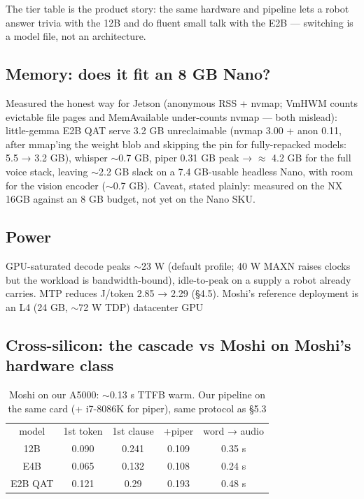 \documentclass[journal]{IEEEtran}
\begin{document}
The tier table is the product story: the same hardware and pipeline lets a robot answer trivia with the 12B and do fluent small talk with the E2B — switching is a model file, not an architecture.

\subsection{Memory: does it fit an 8 GB Nano?}
Measured the honest way for Jetson (anonymous RSS + nvmap; VmHWM counts evictable file pages and MemAvailable under-counts nvmap — both mislead): little-gemma E2B QAT serve 3.2 GB unreclaimable (nvmap 3.00 + anon 0.11, after mmap'ing the weight blob and skipping the pin for fully-repacked models: 5.5 → 3.2 GB), whisper $\sim$0.7 GB, piper 0.31 GB peak → $\approx$ 4.2 GB for the full voice stack, leaving $\sim$2.2 GB slack on a 7.4 GB-usable headless Nano, with room for the vision encoder ($\sim$0.7 GB). Caveat, stated plainly: measured on the NX 16GB against an 8 GB budget, not yet on the Nano SKU.

\subsection{Power}
GPU-saturated decode peaks $\sim$23 W (default profile; 40 W MAXN raises clocks but the workload is bandwidth-bound), idle-to-peak on a supply a robot already carries. MTP reduces J/token 2.85 → 2.29 (§4.5). Moshi's reference deployment is an L4 (24 GB, $\sim$72 W TDP) datacenter GPU

\subsection{Cross-silicon: the cascade vs Moshi on Moshi's hardware class}
\begin{table}[H]
    \centering
    \small
    \begin{tabular}{ccccc}
       model  &  1st token & 1st clause & +piper & word → audio \\
        12B &  0.090& 0.241 & 0.109&0.35 s\\
        E4B & 0.065 & 0.132 & 0.108&0.24 s\\
        E2B QAT & 0.121& 0.29 & 0.193 	&0.48 s\\
    \end{tabular}
    \caption{Moshi on our A5000: $\sim$0.13 s TTFB warm. Our pipeline on the same card (+ i7-8086K for piper), same protocol as §5.3}
    \label{tab:pipeline}
\end{table}
\end{document}
